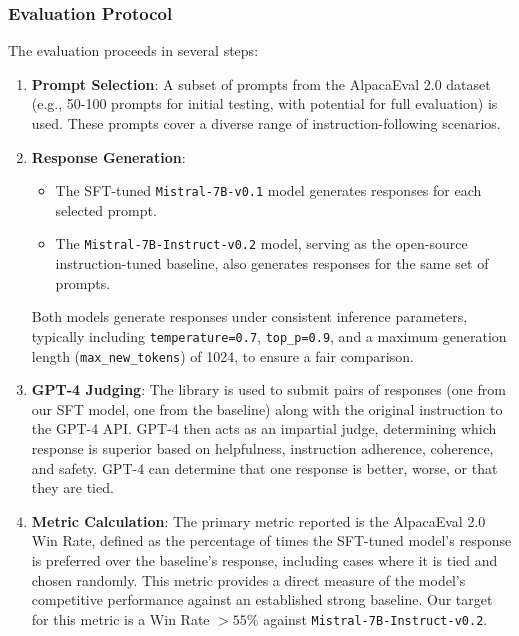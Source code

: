 \documentclass[11pt]{article}
\begin{document}
\subsubsection{Evaluation Protocol}
The evaluation proceeds in several steps:
\begin{enumerate}
    \item \textbf{Prompt Selection}: A subset of prompts from the AlpacaEval 2.0 dataset (e.g., 50-100 prompts for initial testing, with potential for full evaluation) is used. These prompts cover a diverse range of instruction-following scenarios.
    \item \textbf{Response Generation}:
    \begin{itemize}
        \item The SFT-tuned \texttt{Mistral-7B-v0.1} model generates responses for each selected prompt.
        \item The \texttt{Mistral-7B-Instruct-v0.2} model, serving as the open-source instruction-tuned baseline, also generates responses for the same set of prompts.
    \end{itemize}
    Both models generate responses under consistent inference parameters, typically including \texttt{temperature=0.7}, \texttt{top\_p=0.9}, and a maximum generation length (\texttt{max\_new\_tokens}) of 1024, to ensure a fair comparison.
    \item \textbf{GPT-4 Judging}: The  library is used to submit pairs of responses (one from our SFT model, one from the baseline) along with the original instruction to the GPT-4 API. GPT-4 then acts as an impartial judge, determining which response is superior based on helpfulness, instruction adherence, coherence, and safety. GPT-4 can determine that one response is better, worse, or that they are tied.
    \item \textbf{Metric Calculation}: The primary metric reported is the AlpacaEval 2.0 Win Rate, defined as the percentage of times the SFT-tuned model's response is preferred over the baseline's response, including cases where it is tied and chosen randomly. This metric provides a direct measure of the model's competitive performance against an established strong baseline. Our target for this metric is a Win Rate $> 55\%$ against \texttt{Mistral-7B-Instruct-v0.2}.
\end{enumerate}
\end{document}
